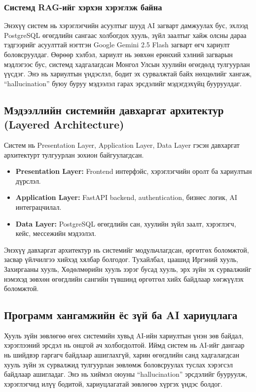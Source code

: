 \subsubsection{Системд RAG-ийг хэрхэн хэрэглэж байна}

Энэхүү систем нь хэрэглэгчийн асуултыг шууд AI загварт дамжуулах бус, эхлээд PostgreSQL өгөгдлийн сангаас холбогдох хууль, зүйл заалтыг хайж олсны дараа тэдгээрийг асуулттай нэгтгэн Google Gemini 2.5 Flash загварт өгч хариулт боловсруулдаг. Өөрөөр хэлбэл, хариулт нь зөвхөн ерөнхий хэлний загварын мэдлэгээс бус, системд хадгалагдсан Монгол Улсын хуулийн өгөгдөлд тулгуурлан үүсдэг. Энэ нь хариултын үндэслэл, бодит эх сурвалжтай байх нөхцөлийг хангаж, ``hallucination'' буюу буруу мэдээлэл гарах эрсдэлийг мэдэгдэхүйц бууруулдаг.

\subsection{Мэдээллийн системийн давхаргат архитектур (Layered Architecture)}

Систем нь Presentation Layer, Application Layer, Data Layer гэсэн давхаргат архитектурт тулгуурлан зохион байгуулагдсан.
\begin{itemize}
    \item \textbf{Presentation Layer:} Frontend интерфэйс, хэрэглэгчийн оролт ба хариултын дүрслэл.
    \item \textbf{Application Layer:} FastAPI backend, authentication, бизнес логик, AI интеграцчилал.
    \item \textbf{Data Layer:} PostgreSQL өгөгдлийн сан, хуулийн зүйл заалт, хэрэглэгч, кейс, мессежийн мэдээлэл.
\end{itemize}

Энэхүү давхаргат архитектур нь системийг модульчлагдсан, өргөтгөх боломжтой, засвар үйлчилгээ хийхэд хялбар болгодог. Тухайлбал, цаашид Иргэний хууль, Захиргааны хууль, Хөдөлмөрийн хууль зэрэг бусад хууль, эрх зүйн эх сурвалжийг нэмэхэд зөвхөн өгөгдлийн сангийн түвшинд өргөтгөл хийх байдлаар хөгжүүлэх боломжтой.

\subsection{Программ хангамжийн ёс зүй ба AI хариуцлага}

Хууль зүйн зөвлөгөө өгөх системийн хувьд AI-ийн хариултын үнэн зөв байдал, хэрэглээний эрсдэл нь онцгой ач холбогдолтой. Иймд систем нь AI-ийг дангаар нь шийдвэр гаргагч байдлаар ашиглахгүй, харин өгөгдлийн санд хадгалагдсан хууль зүйн эх сурвалжид тулгуурлан зөвлөмж боловсруулах туслах хэрэгсэл байдлаар ашигладаг. Энэ нь хиймэл оюуны ``hallucination'' эрсдэлийг бууруулж, хэрэглэгчид илүү бодитой, хариуцлагатай зөвлөгөө хүргэх үндэс болдог.

